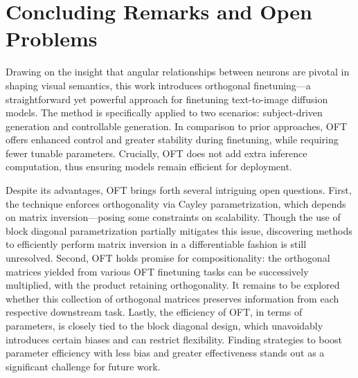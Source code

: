 \section{Concluding Remarks and Open Problems}

Drawing on the insight that angular relationships between neurons are pivotal in shaping visual semantics, this work introduces orthogonal finetuning—a straightforward yet powerful approach for finetuning text-to-image diffusion models. The method is specifically applied to two scenarios: subject-driven generation and controllable generation. In comparison to prior approaches, OFT offers enhanced control and greater stability during finetuning, while requiring fewer tunable parameters. Crucially, OFT does not add extra inference computation, thus ensuring models remain efficient for deployment.

Despite its advantages, OFT brings forth several intriguing open questions. First, the technique enforces orthogonality via Cayley parametrization, which depends on matrix inversion—posing some constraints on scalability. Though the use of block diagonal parametrization partially mitigates this issue, discovering methods to efficiently perform matrix inversion in a differentiable fashion is still unresolved. Second, OFT holds promise for compositionality: the orthogonal matrices yielded from various OFT finetuning tasks can be successively multiplied, with the product retaining orthogonality. It remains to be explored whether this collection of orthogonal matrices preserves information from each respective downstream task. Lastly, the efficiency of OFT, in terms of parameters, is closely tied to the block diagonal design, which unavoidably introduces certain biases and can restrict flexibility. Finding strategies to boost parameter efficiency with less bias and greater effectiveness stands out as a significant challenge for future work.

